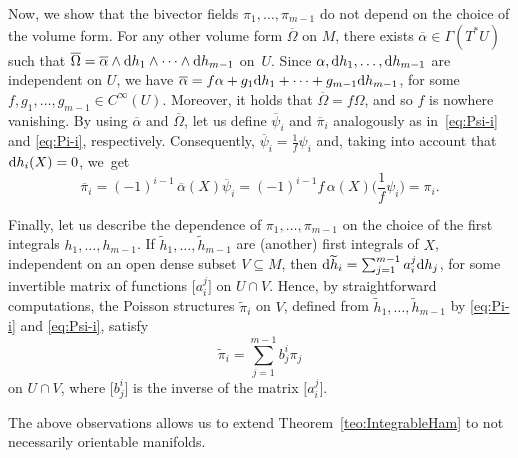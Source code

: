 \documentclass[10pt,a4paper]{amsart}
\newcommand{\dd}{{\rm d}}
\numberwithin{equation}{section}
\begin{document}
Now, we show that the bivector fields $\pi_1,\dots,\pi_{m-1}$ do not depend on the choice of the volume form. For any other volume form $\overline{\Omega}$ on $M$, there exists $\overline{\alpha} \in \Gamma(T^{\ast}U)$ such that $\overline{\Omega} = \overline{\alpha}\wedge\dd h_1\wedge\cdots\wedge\dd h_{m-1}$ on~$U$. Since $\alpha,\dd h_1,\dots,\dd h_{m-1}$ are independent on $U$, we have $\overline{\alpha} = f\alpha + g_1\dd h_1 + \cdots + g_{m-1}\dd h_{m-1}$, for some $f,g_1,\dots,g_{m-1} \in C^{\infty}(U)$. Moreover, it holds that $\overline{\Omega}=f\Omega$, and so $f$ is nowhere vanishing. By using $\overline{\alpha}$ and $\overline{\Omega}$, let us define $\overline{\psi}_{i}$ and $\overline{\pi}_{i}$ analogously as in~\eqref{eq:Psi-i} and \eqref{eq:Pi-i}, respectively. Consequently, $\overline{\psi}_{i}=\tfrac{1}{f}\psi_{i}$ and, taking into account that $\dd h_{i}(X)=0$, we~get
 \begin{equation*}
 \overline{\pi}_{i} = (-1)^{i-1}\,\overline{\alpha}(X)\overline{\psi}_{i} = (-1)^{i-1}f\,\alpha(X)\bigg( \frac{1}{f} \psi_{i} \bigg) = \pi_{i}.
 \end{equation*}

Finally, let us describe the dependence of $\pi_1,\dots,\pi_{m-1}$ on the choice of the first integrals $h_1,\dots,h_{m-1}$. If $\widetilde{h}_1,\dots,\widetilde{h}_{m-1}$ are (another) first integrals of $X$, independent on an open dense subset $V\subseteq M$, then $\dd \widetilde{h}_{i} = \sum_{j=1}^{m-1}a^{j}_{i}\dd h_{j}$, for some invertible matrix of functions $\big[a^{j}_{i}\big]$ on $U\cap V$. Hence, by straightforward computations, the Poisson structures $\widetilde{\pi}_i$ on $V$, defined from $\widetilde{h}_1, \dots, \allowbreak \widetilde{h}_{m-1}$ by \eqref{eq:Pi-i} and \eqref{eq:Psi-i}, satisfy
 \begin{equation}\label{eq:PiTilde}
 \widetilde{\pi}_i = \sum_{j=1}^{m-1}b^{i}_{j}\pi_j
 \end{equation}
on $U\cap V$, where $\big[b^{i}_{j}\big]$ is the inverse of the matrix $\big[a^{j}_{i}\big]$.

The above observations allows us to extend Theorem~\ref{teo:IntegrableHam} to not necessarily orientable manifolds.
\end{document}
